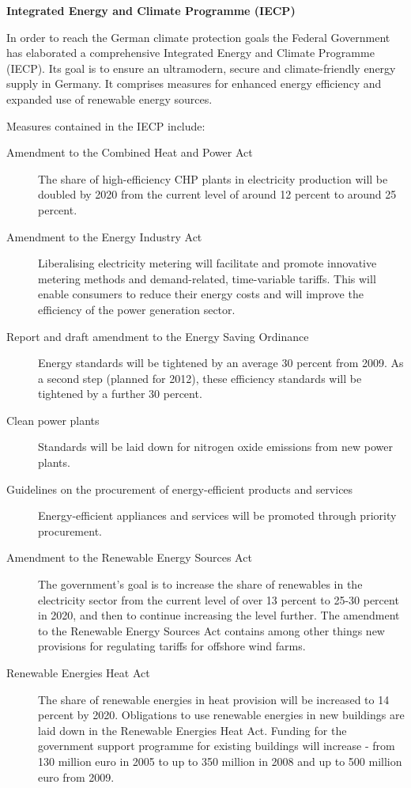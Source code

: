 \textbf{Integrated Energy and Climate Programme (IECP)}



In order to reach the German climate protection goals the Federal Government has elaborated a comprehensive Integrated Energy and Climate Programme (IECP). 
Its goal is to ensure an ultramodern, secure and climate-friendly energy supply in Germany. 
It comprises measures for enhanced energy efficiency and expanded use of renewable energy sources.


Measures contained in the IECP include:
\begin{description}
	\item[Amendment to the Combined Heat and Power Act] The share of high-efficiency CHP plants in electricity production will be doubled by 2020 from the current level of around 12 percent to around 25 percent.
	\item[Amendment to the Energy Industry Act] Liberalising electricity metering will facilitate and promote innovative metering methods and demand-related, time-variable tariffs. This will enable consumers to reduce their energy costs and will improve the efficiency of the power generation sector.
	\item[Report and draft amendment to the Energy Saving Ordinance] Energy standards will be tightened by an average 30 percent from 2009. As a second step (planned for 2012), these efficiency standards will be tightened by a further 30 percent.
	\item[Clean power plants] Standards will be laid down for nitrogen oxide emissions from new power plants.
	\item[Guidelines on the procurement of energy-efficient products and services] Energy-efficient appliances and services will be promoted through priority procurement.
	\item[Amendment to the Renewable Energy Sources Act] The government’s goal is to increase the share of renewables in the electricity sector from the current level of over 13 percent to 25-30 percent in 2020, and then to continue increasing the level further. The amendment to the Renewable Energy Sources Act contains among other things new provisions for regulating tariffs for offshore wind farms.
	\item[Renewable Energies Heat Act] The share of renewable energies in heat provision will be increased to 14 percent by 2020. Obligations to use renewable energies in new buildings are laid down in the Renewable Energies Heat Act. Funding for the government support programme for existing buildings will increase - from 130 million euro in 2005 to up to 350 million in 2008 and up to 500 million euro from 2009.

\end{description}
